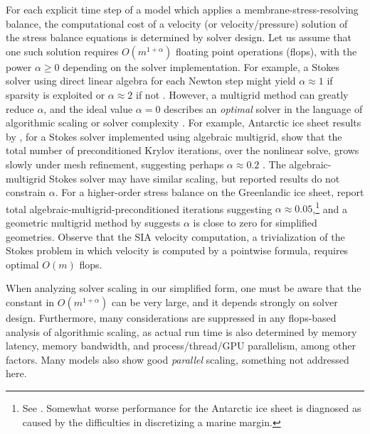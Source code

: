 \documentclass[review,letterpaper]{igs}
\begin{document}
For each explicit time step of a model which applies a membrane-stress-resolving balance, the computational cost of a velocity (or velocity/pressure) solution of the stress balance equations is determined by solver design.  Let us assume that one such solution requires $O(m^{1+\alpha})$ floating point operations (flops),  with the power $\alpha\ge 0$ depending on the solver implementation.  For example, a Stokes solver using direct linear algebra for each Newton step might yield $\alpha \approx 1$ if sparsity is exploited or $\alpha \approx 2$ if not \citep{Bueler2021}.  However, a multigrid method \citep{Trottenbergetal2001} can greatly reduce $\alpha$, and the ideal value $\alpha=0$ describes an \emph{optimal} solver in the language of algorithmic scaling or solver complexity \citep{Bueler2021}.  For example, Antarctic ice sheet results by \cite{IsaacStadlerGhattas2015}, for a Stokes solver implemented using algebraic multigrid, show that the total number of preconditioned Krylov iterations, over the nonlinear solve, grows slowly under mesh refinement, suggesting perhaps $\alpha\approx 0.2$ \citep[Table 8.1]{IsaacStadlerGhattas2015}.  The \cite{Lengetal2012} algebraic-multigrid Stokes solver may have similar scaling, but reported results do not constrain $\alpha$.  For a higher-order stress balance on the Greenlandic ice sheet, \cite{Tuminaroetal2016} report total algebraic-multigrid-preconditioned iterations suggesting $\alpha \approx 0.05$,\footnote{See \citep[Table 7.5]{Tuminaroetal2016}.  Somewhat worse performance for the Antarctic ice sheet is diagnosed as caused by the difficulties in discretizing a marine margin.} and a geometric multigrid method by \citep{BrownSmithAhmadia2013} suggests $\alpha$ is close to zero for simplified geometries.  Observe that the SIA velocity computation, a trivialization of the Stokes problem in which velocity is computed by a pointwise formula, requires optimal $O(m)$ flops.

When analyzing solver scaling in our simplified form, one must be aware that the constant in $O(m^{1+\alpha})$ can be very large, and it depends strongly on solver design.  Furthermore, many considerations are suppressed in any flops-based analysis of algorithmic scaling, as actual run time is also determined by memory latency, memory bandwidth, and process/thread/GPU parallelism, among other factors.  Many models \citep[e.g.][]{BrownSmithAhmadia2013,Fischleretal2022,IsaacStadlerGhattas2015,Lengetal2012,Tuminaroetal2016} also show good \emph{parallel} scaling, something not addressed here.
\end{document}
